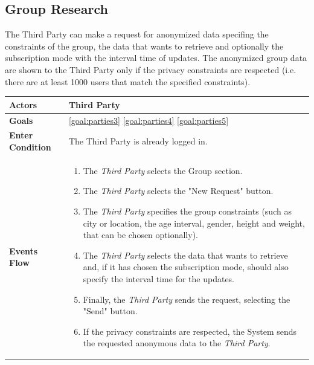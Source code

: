 \newpage
\subsection{Group Research}
The Third Party can make a request for anonymized data specifing the constraints of the group, the data that wants to retrieve and optionally the subscription mode with the interval time of updates. The anonymized group data are shown to the Third Party only if the privacy constraints are respected (i.e. there are at least 1000 users that match the specified constraints).

\begin{table}[H]
	\centering
    
    \begin{tabular}{|p{3.5cm}|p{10.3cm}|}
    
    \hline
    \textbf{\large{Actors}}  			& \tabitem Third Party 																\\
    \hline
    \textbf{\large{Goals}} 				& \ref{goal:parties3}                                                         \ref{goal:parties4}                                    \ref{goal:parties5} \\
    
    \hline
    
    \textbf{\large{Enter Condition}}	& The Third Party is already logged in. \\
    
    \hline
    
    \textbf{\large{Events Flow}}		& \begin{enumerate}[leftmargin=0.5cm]
                                \item The \emph{Third Party} selects the Group section.
                                \item The \emph{Third Party} selects the "New Request" button.
                                \item The \emph{Third Party} specifies the group constraints (such as city or location, the age interval, gender, height and weight, that can be chosen optionally).
                                 \item The \emph{Third Party} selects the data that wants to retrieve and, if it has chosen the subscription mode, should also specify the interval time for the updates.
                                 \item Finally, the \emph{Third Party} sends the request, selecting the "Send" button.
                                 \item If the privacy constraints are respected, the System sends the requested anonymous data to the \emph{Third Party}.
                                           

\end{enumerate}
\end{tabular}
\end{table}

